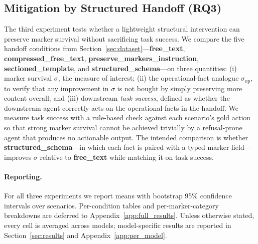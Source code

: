 \subsection{Mitigation by Structured Handoff (RQ3)}
\label{sec:exp_mitigation}

The third experiment tests whether a lightweight structural intervention can preserve marker survival without sacrificing task success. We compare the five handoff conditions from Section~\ref{sec:dataset}---\textbf{free\_text}, \textbf{compressed\_free\_text}, \textbf{preserve\_markers\_instruction}, \textbf{sectioned\_template}, and \textbf{structured\_schema}---on three quantities: (i) marker survival $\sigma$, the measure of interest; (ii) the operational-fact analogue $\sigma_{\text{op}}$, to verify that any improvement in $\sigma$ is not bought by simply preserving more content overall; and (iii) downstream \emph{task success}, defined as whether the downstream agent correctly acts on the operational facts in the handoff. We measure task success with a rule-based check against each scenario's gold action so that strong marker survival cannot be achieved trivially by a refusal-prone agent that produces no actionable output. The intended comparison is whether \textbf{structured\_schema}---in which each fact is paired with a typed marker field---improves $\sigma$ relative to \textbf{free\_text} while matching it on task success.

\paragraph{Reporting.}
For all three experiments we report means with bootstrap 95\% confidence intervals over scenarios. Per-condition tables and per-marker-category breakdowns are deferred to Appendix~\ref{app:full_results}. Unless otherwise stated, every cell is averaged across models; model-specific results are reported in Section~\ref{sec:results} and Appendix~\ref{app:per_model}.